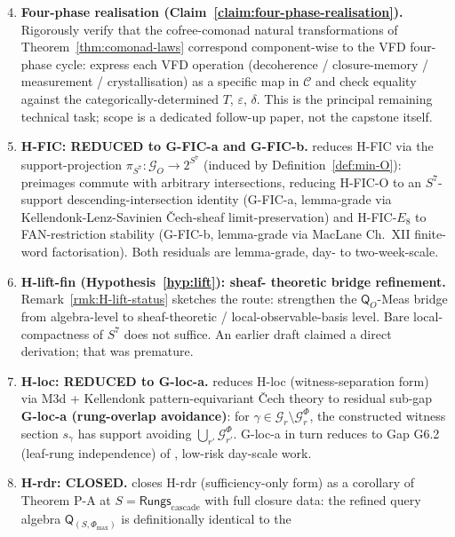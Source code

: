 \documentclass[11pt, a4paper]{amsart}
\theoremstyle{definition}
\newcommand{\Rungs}{\mathsf{Rungs}}
\newcommand{\catC}{\mathcal{C}}
\newcommand{\Gcal}{\mathcal{G}}
\newcommand{\Qalg}{\mathsf{Q}}
\begin{document}
\begin{enumerate}\setcounter{enumi}{3}
\item \textbf{Four-phase realisation
  (Claim~\ref{claim:four-phase-realisation}).} Rigorously verify
  that the cofree-comonad natural transformations of
  Theorem~\ref{thm:comonad-laws} correspond component-wise to
  the VFD four-phase cycle: express each VFD operation
  (decoherence / closure-memory / measurement / crystallisation)
  as a specific map in $\catC$ and check equality against the
  categorically-determined $T$, $\varepsilon$, $\delta$. This is
  the principal remaining technical task; scope is a dedicated
  follow-up paper, not the capstone itself.
\item \textbf{H-FIC: REDUCED to G-FIC-a and G-FIC-b.}
  \cite{CascadeHFICClosure} reduces H-FIC via the
  support-projection $\pi_{S^7} \colon \Gcal_O \to 2^{S^7}$
  (induced by Definition~\ref{def:min-O}): preimages commute
  with arbitrary intersections, reducing H-FIC-O to an
  $S^7$-support descending-intersection identity (G-FIC-a,
  lemma-grade via Kellendonk-Lenz-Savinien Čech-sheaf
  limit-preservation) and H-FIC-$E_8$ to FAN-restriction
  stability (G-FIC-b, lemma-grade via MacLane Ch.~XII
  finite-word factorisation). Both residuals are lemma-grade,
  day- to two-week-scale.
\item \textbf{H-lift-fin (Hypothesis~\ref{hyp:lift}): sheaf-
  theoretic bridge refinement.}
  Remark~\ref{rmk:H-lift-status} sketches the route:
  strengthen the $\Qalg_O$-Meas bridge from algebra-level to
  sheaf-theoretic / local-observable-basis level. Bare local-
  compactness of $S^7$ does not suffice. An earlier draft
  claimed a direct derivation; that was premature.
\item \textbf{H-loc: REDUCED to G-loc-a.}
  \cite{CascadeHlocClosure} reduces H-loc (witness-separation
  form) via M3d + Kellendonk pattern-equivariant Čech theory
  to residual sub-gap \textbf{G-loc-a (rung-overlap avoidance)}:
  for $\gamma \in \Gcal_r \setminus \Gcal_r^\Phi$, the
  constructed witness section $s_\gamma$ has support avoiding
  $\bigcup_{r'} \Gcal_{r'}^\Phi$. G-loc-a in turn reduces to
  Gap G6.2 (leaf-rung independence) of
  \cite{CascadeObserverQueryAlgebra}, low-risk day-scale work.
\item \textbf{H-rdr: CLOSED.}
  \cite{CascadeHrdrClosure} closes H-rdr (sufficiency-only form)
  as a corollary of Theorem P-A at $S = \Rungs_{\mathrm{cascade}}$
  with full closure data: the refined query algebra
  $\Qalg_{(S, \Phi_{\max})}$ is definitionally identical to the

\end{enumerate}
\end{document}
